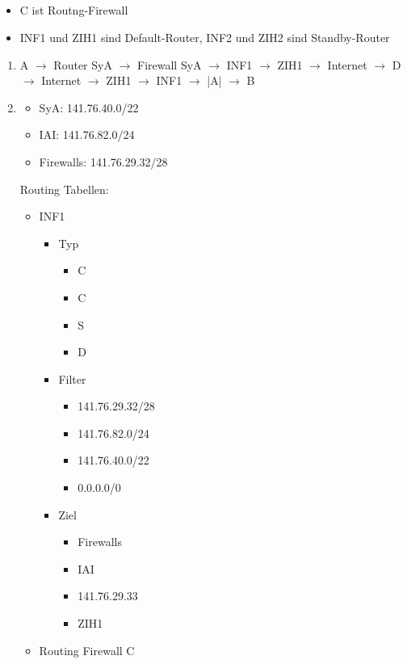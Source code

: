 \subsection{}
\begin{itemize}
	\item C ist Routng-Firewall
	\item INF1 und ZIH1 sind Default-Router, INF2 und ZIH2 sind Standby-Router
\end{itemize}
\begin{enumerate}
	\item A $\to$ Router SyA $\to$ Firewall SyA $\to$ INF1 $\to$ ZIH1 $\to$ Internet $\to$ D $\to$ Internet $\to$ ZIH1 $\to$ INF1 $\to$ |A| $\to$ B
	\item	
	\begin{itemize}
	\item SyA: 141.76.40.0/22
	\item IAI: 141.76.82.0/24
	\item Firewalls: 141.76.29.32/28
	\end{itemize}
	Routing Tabellen:	
	\begin{itemize}
		\item INF1
		\begin{itemize}
			\item Typ
			\begin{itemize}
				\item C
				\item C
				\item S
				\item D
			\end{itemize}
			\item Filter
			\begin{itemize}
				\item 141.76.29.32/28
				\item 141.76.82.0/24
				\item 141.76.40.0/22
				\item 0.0.0.0/0
			\end{itemize}
			\item Ziel
			\begin{itemize}
				\item Firewalls
				\item IAI
				\item 141.76.29.33
				\item ZIH1
			\end{itemize}
		\end{itemize}
		\item Routing Firewall C
		\begin{itemize}

\end{itemize}
\end{itemize}
\end{enumerate}

